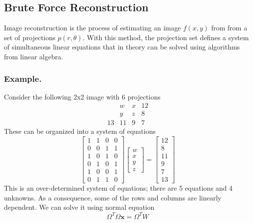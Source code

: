 \documentclass[../../../main.tex]{subfiles}
\begin{document}
\subsection{Brute Force Reconstruction}
Image reconstruction is the process of estimating an image $f(x,y)$ from from a set of projections $p(r,\theta)$.
With this method, the projection set defines a system of simultaneous linear equations that in theory can be solved using algorithms from linear algebra.

\subsubsection{Example.}
Consider the following 2x2 image with 6 projections
\begin{equation*}
    \begin{matrix}
           & w  & x & 12 \\
           & y  & z & 8  \\
        13 & 11 & 9 & 7
    \end{matrix}
\end{equation*}
These can be organized into a system of equations
\begin{equation*}
    \begin{bmatrix}
        1 & 1 & 0 & 0 \\
        0 & 0 & 1 & 1 \\
        1 & 0 & 1 & 0 \\
        0 & 1 & 0 & 1 \\
        1 & 0 & 0 & 1 \\
        0 & 1 & 1 & 0
    \end{bmatrix}
    \begin{bmatrix}
        w \\ x \\ y \\ z
    \end{bmatrix}
    =
    \begin{bmatrix}
        12 \\ 8 \\ 11 \\ 9 \\ 7 \\ 13
    \end{bmatrix}
\end{equation*}
This is an over-determined system of equations; there are 5 equations and 4 unknowns.
As a consequence, some of the rows and columns are linearly dependent.
We can solve it using normal equation
\begin{equation*}
    \Omega^T \Omega \mathbf{x}=\Omega^T W
\end{equation*}
\end{document}
